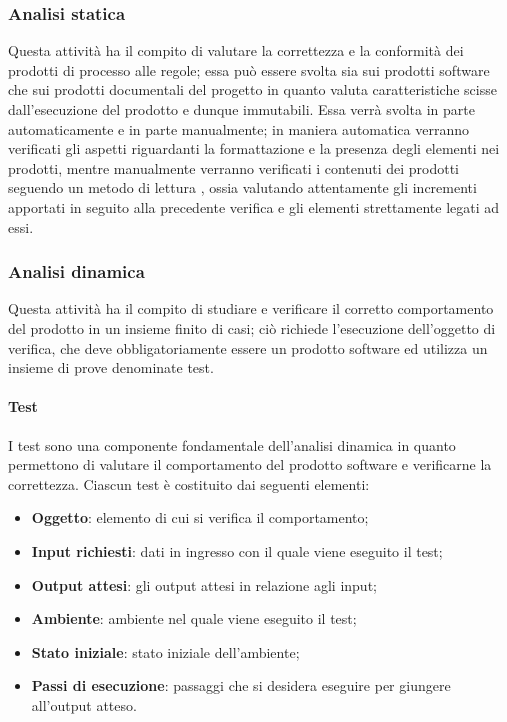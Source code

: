 \subsubsection{Analisi statica}
\label{ssub:verifica:analisi_statica}

Questa attività ha il compito di valutare la correttezza e la conformità dei prodotti di processo alle regole; essa può essere svolta sia 
sui prodotti software che sui prodotti documentali del progetto in quanto valuta caratteristiche scisse dall'esecuzione del prodotto e 
dunque immutabili. Essa verrà svolta in parte automaticamente e in parte manualmente; in maniera automatica verranno verificati gli 
aspetti riguardanti la formattazione e la presenza degli elementi nei prodotti, mentre manualmente verranno verificati i contenuti dei 
prodotti seguendo un metodo di lettura , ossia valutando attentamente gli incrementi apportati in seguito alla 
precedente verifica e gli elementi strettamente legati ad essi.

\subsubsection{Analisi dinamica}
\label{ssub:verifica:analisi_dinamica}

Questa attività ha il compito di studiare e verificare il corretto comportamento del prodotto in un insieme finito di casi; ciò richiede 
l'esecuzione dell'oggetto di verifica, che deve obbligatoriamente essere un prodotto software ed utilizza un insieme di prove denominate 
test.

\paragraph{Test}
\label{par:verifica:test}

I test sono una componente fondamentale dell'analisi dinamica in quanto permettono di valutare il comportamento del prodotto software e 
verificarne la correttezza.
Ciascun test è costituito dai seguenti elementi:
\begin{itemize}
    \item \textbf{Oggetto}: elemento di cui si verifica il comportamento;
    \item \textbf{Input richiesti}: dati in ingresso con il quale viene eseguito il test;
    \item \textbf{Output attesi}: gli output attesi in relazione agli input;
    \item \textbf{Ambiente}: ambiente nel quale viene eseguito il test;
    \item \textbf{Stato iniziale}: stato iniziale dell'ambiente;
    \item \textbf{Passi di esecuzione}: passaggi che si desidera eseguire per giungere all'output atteso.
\end{itemize}

